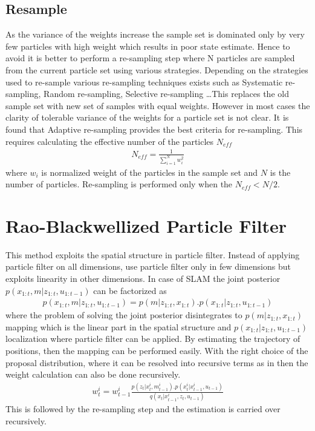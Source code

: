 \subsection{Resample}
As the variance of the weights increase the sample set is dominated only by very few particles with high weight which results in poor state estimate. Hence to avoid it is better to perform a re-sampling step where N particles are sampled from the current particle set using various strategies. Depending on the strategies used to re-sample various re-sampling techniques exists such as Systematic re-sampling, Random re-sampling, Selective re-sampling \dots This replaces the old sample set with new set of samples with equal weights. However in most cases the clarity of tolerable variance of the weights for a particle set is not clear. It is found that Adaptive re-sampling provides the best criteria for re-sampling. This requires calculating the effective number of the particles ${N_{eff}}$
\begin{gather} \label{Neff}
N_{eff} = \frac{1}{\sum_{i=1}^{N} w_{i}^{2} } 
\end{gather}
where ${w_{i}}$ is normalized weight of the particles in the sample set and ${N}$ is the number of particles.  Re-sampling is performed only 
when the ${N_{eff} < N/2}$.
\section{Rao-Blackwellized Particle Filter}
 This method exploits the spatial structure in particle filter. Instead of applying particle filter on all dimensions, use particle filter only in few dimensions but exploits linearity in other dimensions. In case of SLAM the joint posterior $p(x_{1:t}, m | z_{1:t}, u_{1:t-1})$ can be factorized as 
\begin{gather} \label{RAoB}
    p(x_{1:t}, m | z_{1:t}, u_{1:t-1}) = p(m | z_{1:t}, x_{1:t}).p(x_{1:t} | z_{1:t}, u_{1:t-1})
\end{gather}
where the problem of solving the joint posterior disintegrates to $p(m | z_{1:t}, x_{1:t})$ mapping which is the linear part in the spatial structure and $p(x_{1:t} | z_{1:t}, u_{1:t-1})$ localization where particle filter can be applied. By estimating the trajectory of positions, then the mapping can be performed easily. With the right choice of the proposal distribution, where it can be resolved into recursive terms as in  then the weight calculation can also be done recursively.
\begin{gather} \label{RaoB_weight}
    w_{t}^{i} = w_{t-1}^{i} \frac{p(z_{t}|x_{t}^{i}, m_{t-1}^{i}). p(x_{t}^{i}|x_{t-1}^{i}, u_{t-1})}{q(x_t|x_{t-1}^{i},z_{t}, u_{t-1})}
\end{gather}
This is followed by the re-sampling step and the estimation is carried over recursively.
